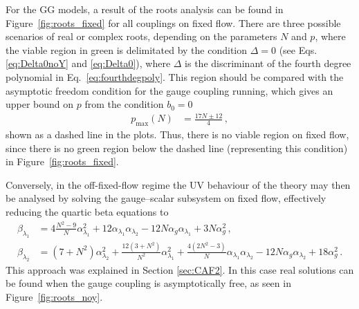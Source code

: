 For the GG models, a result of the roots analysis can be found in Figure~\ref{fig:roots_fixed} for all couplings on fixed flow. There are three possible scenarios of real or complex roots, depending on the parameters $N$ and $p$, where the viable region in green is delimitated by the condition $\Delta=0$ (see Eqs. \eqref{eq:Delta0noY} and \eqref{eq:Delta0}), where $\Delta$ is the discriminant of the fourth degree polynomial in Eq.~\eqref{eq:fourthdegpoly}. This region should be compared with the asymptotic freedom condition for the gauge coupling running, which gives an upper bound on $p$ from the condition $b_0=0$
\begin{align}
    p_{\max}(N)&=\frac{17N\pm12}{4}\,, \label{eq:pmaxadj}
\end{align}
shown as a dashed line in the plots. Thus, there is no viable region on fixed flow, since there is no green region below the dashed line (representing this condition) in Figure~\ref{fig:roots_fixed}.

Conversely, in the off-fixed-flow regime the UV behaviour of the theory may then be analysed by solving the gauge–scalar subsystem on fixed flow, effectively reducing the quartic beta equations to
\begin{align}
    \beta_{{\lambda_1}} &=4\frac{N^2-9}{N}\alpha_{\lambda_1}^2+12\alpha_{\lambda_1}\alpha_{\lambda_2}-12N\alpha_{g}\alpha_{\lambda_1}+3N\alpha_g^2 \,,\label{eq:beta1yoff}
    \\
    \beta_{{\lambda_2}}&=(7+N^2)\alpha_{\lambda_2}^2+\frac{12(3+N^2)}{N^2}\alpha_{\lambda_1}^2+\frac{4(2N^2-3)}{N}\alpha_{\lambda_1}\alpha_{\lambda_2}-12N\alpha_{g}\alpha_{\lambda_2}+18\alpha_{g}^2\,.\label{eq:beta12yoff}
\end{align}
This approach was explained in Section \ref{sec:CAF2}. In this case real solutions can be found when the gauge coupling is asymptotically free, as seen in Figure~\ref{fig:roots_noy}.

